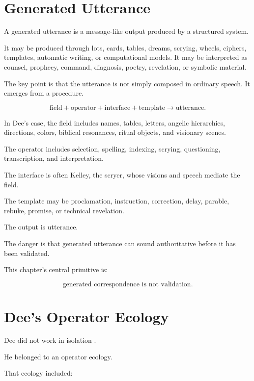 \documentclass[11pt]{book}
\begin{document}
\section{Generated Utterance}

A generated utterance is a message-like output produced by a structured system.

It may be produced through lots, cards, tables, dreams, scrying, wheels, ciphers, templates, automatic writing, or computational models. It may be interpreted as counsel, prophecy, command, diagnosis, poetry, revelation, or symbolic material.

The key point is that the utterance is not simply composed in ordinary speech. It emerges from a procedure.

\[
\text{field}
+
\text{operator}
+
\text{interface}
+
\text{template}
\rightarrow
\text{utterance}.
\]

In Dee's case, the field includes names, tables, letters, angelic hierarchies, directions, colors, biblical resonances, ritual objects, and visionary scenes.

The operator includes selection, spelling, indexing, scrying, questioning, transcription, and interpretation.

The interface is often Kelley, the scryer, whose visions and speech mediate the field.

The template may be proclamation, instruction, correction, delay, parable, rebuke, promise, or technical revelation.

The output is utterance.

The danger is that generated utterance can sound authoritative before it has been validated.

This chapter's central primitive is:

\[
\text{generated correspondence is not validation}.
\]

\section{Dee's Operator Ecology}

Dee did not work in isolation \cite{Yates1964GiordanoBruno,DeeCasaubon1659TrueFaithfulRelation}.

He belonged to an operator ecology.

That ecology included:
\end{document}
